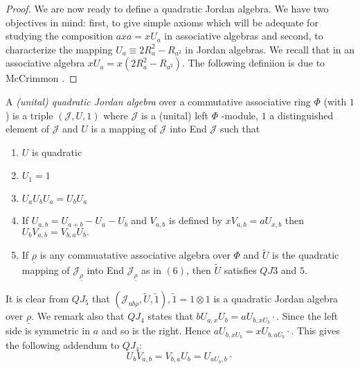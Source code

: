 \begin{proof}
We are now ready to define a quadratic Jordan algebra. We have two
objectives in mind: first, to give simple axioms which will be
adequate for studying the composition $ax a=xU_a$ in associative
algebras and second, to characterize the mapping $U_a\equiv
2R^{2}_a-R_{a^{2}}$ in Jordan algebras. We recall that in an
associative algebra $xU_a=x(2R^{2}_a-R_{a^{2}})$. The following
definiion is due to McCrimmon \cite{McCrimmon1}. 
\end{proof}

\begin{defn}\label{c1:defn3}
  A {\em (unital) quadratic Jordan algebra} over a commutative
  associative ring $\Phi$ (with $1$) is a triple $(\mathscr{J},U,1)$
  where $\mathscr{J}$ is a (unital) left $\Phi$ -module, $1$ a
  distinguished element of $\mathscr{J}$ and $U$ is a mapping of
  $\mathscr{J}$ into End $\mathscr{J}$ such that 
\end{defn}
\pageoriginale
\begin{enumerate}[\rm QJ1]
\item $U$ is quadratic

\item $U_1=1$

\item $U_a U_b U_a= U_b U_a$

\item If $U_{a,b}=U_{a+b}-U_a-U_b$ and $V_{a,b}$ is defined by
  $xV_{a,b}=a U_{x,b}$ then $U_b V_{a,b}=V_{b,a} U_b.$

\item If $\underline{\rho}$ is any commuatative associative algebra
  over $\Phi$ and $\widetilde{U}$ is the quadratic mapping of
  $\mathscr{J}_{\underline{\rho}}$ into End
  $\mathscr{J}_{\underline{\rho}}$ as in $(6)$, then $\widetilde{U}$
  satisfies $QJ3$ and $5$. 
\end{enumerate}

It is clear from $QJ_5$ that
$(\mathscr{J}_{ub{\rho}},\widetilde{U},\widetilde{1}), 
\widetilde{1}=1\otimes 1$ is a quadratic Jordan algebra over
$\underline{\rho}$. We remark also that $QJ_4$ states that $b U_{a,x}
U_{b}=a U_{b, x U_b}\cdot$. Since the left side is symmetric in $a$ and
so is the right. Hence $a U_{b, x U_b}=xU_{b,aU_b}\cdot$. This gives
the following addendum to $QJ_4$: 
\begin{equation*}
  U_b V_{a,b}=V_{b,a} U_b=U_{aU_{b},b}\cdot\tag*{$QJ4'$}
\end{equation*}


